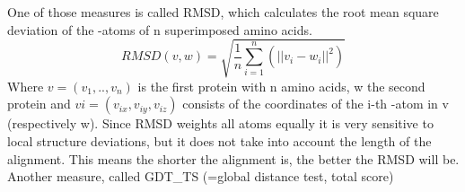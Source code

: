 \documentclass[]{article}
\begin{document}
\noindent One of those measures is called RMSD, which calculates the root mean square deviation of the -atoms of n superimposed amino acids. \newline
\begin{displaymath}
	RMSD(v,w)=\sqrt{\frac{1}{n}\sum_{i=1}^{n}(||v_i-w_i||^2)}
\end{displaymath}
Where $v = (v_1,..,v_n)$ is the first protein with n amino acids, w the second protein and $vi = (v_{ix}, v_{iy}, v_{iz})$ consists of the coordinates of the i-th -atom in v (respectively w). \newline
Since RMSD weights all atoms equally it is very sensitive to local structure deviations, but it does not take into account the length of the alignment. This means the shorter the alignment is, the better the RMSD will be. \newline
\newline
Another measure, called GDT\_TS (=global distance test, total score) 
\end{document}
